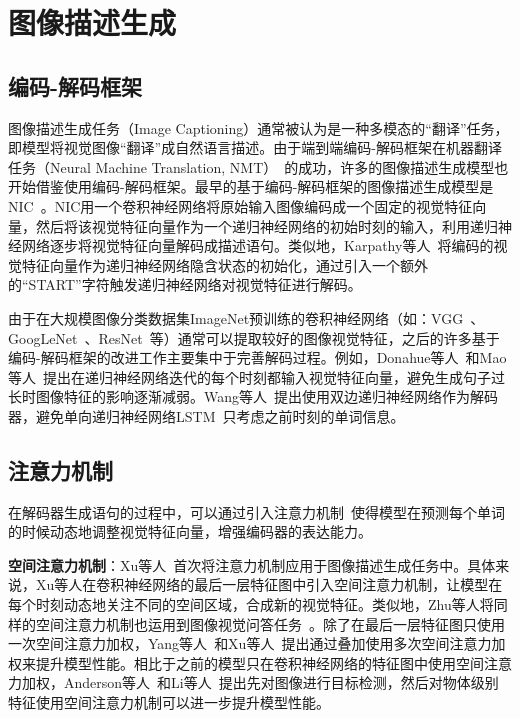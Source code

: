 \section{图像描述生成}

\subsection{编码-解码框架}

图像描述生成任务（Image Captioning）通常被认为是一种多模态的“翻译”任务，即模型将视觉图像“翻译”成自然语言描述。由于端到端编码-解码框架在机器翻译任务（Neural Machine Translation, NMT）~\cite{sutskever2014sequence}的成功，许多的图像描述生成模型也开始借鉴使用编码-解码框架。最早的基于编码-解码框架的图像描述生成模型是NIC~\cite{vinyals2015show}。NIC用一个卷积神经网络将原始输入图像编码成一个固定的视觉特征向量，然后将该视觉特征向量作为一个递归神经网络的初始时刻的输入，利用递归神经网络逐步将视觉特征向量解码成描述语句。类似地，Karpathy等人~\cite{karpathy2015deep}将编码的视觉特征向量作为递归神经网络隐含状态的初始化，通过引入一个额外的“START”字符触发递归神经网络对视觉特征进行解码。

由于在大规模图像分类数据集ImageNet预训练的卷积神经网络（如：VGG~\cite{simonyan2015very}、GoogLeNet~\cite{szegedy2015going}、ResNet~\cite{he2016deep}等）通常可以提取较好的图像视觉特征，之后的许多基于编码-解码框架的改进工作主要集中于完善解码过程。例如，Donahue等人~\cite{donahue2015long}和Mao等人~\cite{mao2015deep}提出在递归神经网络迭代的每个时刻都输入视觉特征向量，避免生成句子过长时图像特征的影响逐渐减弱。Wang等人~\cite{wang2016image}提出使用双边递归神经网络作为解码器，避免单向递归神经网络LSTM~\cite{hochreiter1997long}只考虑之前时刻的单词信息。

\subsection{注意力机制}

在解码器生成语句的过程中，可以通过引入注意力机制~\cite{bahdanau2014neural}使得模型在预测每个单词的时候动态地调整视觉特征向量，增强编码器的表达能力。

\textbf{空间注意力机制}：Xu等人~\cite{xu2015show}首次将注意力机制应用于图像描述生成任务中。具体来说，Xu等人在卷积神经网络的最后一层特征图中引入空间注意力机制，让模型在每个时刻动态地关注不同的空间区域，合成新的视觉特征。类似地，Zhu等人将同样的空间注意力机制也运用到图像视觉问答任务~\cite{zhu2016visual7w}。除了在最后一层特征图只使用一次空间注意力加权，Yang等人~\cite{yang2016stacked}和Xu等人~\cite{xu2016ask}提出通过叠加使用多次空间注意力加权来提升模型性能。相比于之前的模型只在卷积神经网络的特征图中使用空间注意力加权，Anderson等人~\cite{anderson2018bottom}和Li等人~\cite{li2016visual}提出先对图像进行目标检测，然后对物体级别特征使用空间注意力机制可以进一步提升模型性能。

